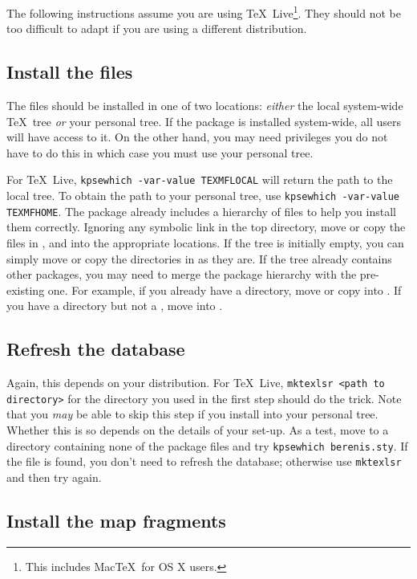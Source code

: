 \documentclass[11pt,british]{article}
\begin{document}
The following instructions assume you are using \TeX~Live\footnote{This includes Mac\TeX\ for OS X users.}. They should not be too difficult to adapt if you are using a different distribution.

\subsection{Install the files}

The files should be installed in one of two locations: \emph{either} the local system-wide \TeX\ tree \emph{or} your personal tree. If the package is installed system-wide, all users will have access to it. On the other hand, you may need privileges you do not have to do this in which case you must use your personal tree.

For \TeX~Live, \verb|kpsewhich -var-value TEXMFLOCAL| will return the path to the local tree. To obtain the path to your personal tree, use \verb|kpsewhich -var-value TEXMFHOME|. The package already includes a hierarchy of files to help you install them correctly. Ignoring any symbolic link in the top directory, move or copy the files in ,  and  into the appropriate locations. If the tree is initially empty, you can simply move or copy the directories in as they are. If the tree already contains other packages, you may need to merge the package hierarchy with the pre-existing one. For example, if you already have a  directory, move or copy  into . If you have a  directory but not a , move  into .

\subsection{Refresh the database}

Again, this depends on your distribution. For \TeX~Live, \verb|mktexlsr <path to directory>| for the directory you used in the first step should do the trick. Note that you \emph{may} be able to skip this step if you install into your personal tree. Whether this is so depends on the details of your set-up. As a test, move to a directory containing none of the package files and try \verb|kpsewhich berenis.sty|. If the file is found, you don't need to refresh the database; otherwise use \verb|mktexlsr| and then try again.

\subsection{Install the map fragments}
\end{document}
